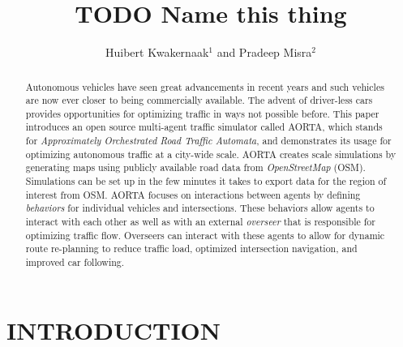 \documentclass[letterpaper, 10 pt, conference]{ieeeconf}  %
\title{\LARGE \bf
TODO Name this thing
}
\author{Huibert Kwakernaak$^{1}$ and Pradeep Misra$^{2}$%
}
\begin{document}
\maketitle
\thispagestyle{empty}
\pagestyle{empty}



\begin{abstract}
Autonomous vehicles have seen great advancements in recent years and such vehicles are now ever closer to being commercially available. The advent of driver-less cars provides opportunities for optimizing traffic in ways not possible before. This paper introduces an open source multi-agent traffic simulator called AORTA, which stands for \textit{Approximately Orchestrated Road Traffic Automata}, and demonstrates its usage for optimizing autonomous traffic at a city-wide scale. AORTA creates scale simulations by generating maps using publicly available road data from \textit{OpenStreetMap} (OSM). Simulations can be set up in the few minutes it takes to export data for the region of interest from OSM. AORTA focuses on interactions between agents by defining \textit{behaviors} for individual vehicles and intersections. These behaviors allow agents to interact with each other as well as with an external \textit{overseer} that is responsible for optimizing traffic flow. Overseers can interact with these agents to allow for dynamic route re-planning to reduce traffic load, optimized intersection navigation, and improved car following. 
\end{abstract}


\section{INTRODUCTION}
\label{sec:introduction}

\end{document}
